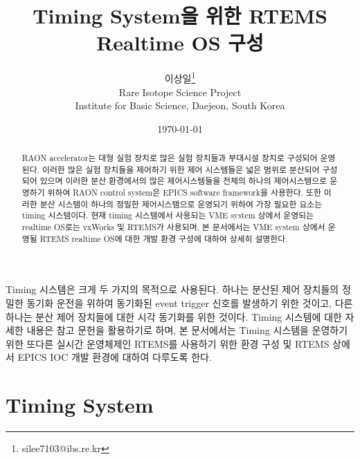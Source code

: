 \documentclass[11pt
  , a4paper
  , article
  , oneside
]{memoir}
\begin{document}
\newcommand{\technumber}{
  RAON Control-Document Series\\
  Revision : v1.0,   Release : 2014-12-24 fixed date}
\title{\textbf{Timing System을 위한 RTEMS Realtime OS 구성}}

\author{이상일\thanks{silee7103@ibs.re.kr} \\

  Rare Isotope Science Project\\
  Institute for Basic Science, Daejeon, South Korea
}
\date{\today}

\renewcommand{\maketitlehooka}{\begin{flushright}\textsf{\technumber}\end{flushright}}

\maketitle

\begin{abstract}
RAON accelerator는 대형 실험 장치로 많은 실험 장치들과 부대시설 장치로 구성되어 운영된다. 이러한 많은 실험 장치들을 제어하기 위한 제어 시스템들은 넓은 범위로 분산되어 구성되어 있으며 이러한 분산 환경에서의 많은 제어시스템들을 전체의 하나의 제어시스템으로 운영하기 위하여 RAON control system은 EPICS software framework을 사용한다. 또한 이러한 분산 시스템이 하나의 정밀한 제어시스템으로 운영되기 위하여 가장 필요한 요소는 timing 시스템이다. 현재 timing 시스템에서 사용되는 VME system 상에서 운영되는 realtime OS로는 vxWorks 및 RTEMS가 사용되며, 본 문서에서는 VME system 상에서 운영될 RTEMS realtime OS에 대한 개발 환경 구성에 대하여 상세히 설명한다. 
\end{abstract}

Timing 시스템은 크게 두 가지의 목적으로 사용된다. 하나는 분산된 제어 장치들의 정밀한 동기화 운전을 위하여 동기화된 event trigger 신호를 발생하기 위한 것이고, 다른 하나는 분산 제어 장치들에 대한 시각 동기화를 위한 것이다. Timing 시스템에 대한 자세한 내용은 참고 문헌을 활용하기로 하며, 본 문서에서는 Timing 시스템을 운영하기 위한 또다른 실시간 운영체제인 RTEMS를 사용하기 위한 환경 구성 및 RTEMS 상에서 EPICS IOC 개발 환경에 대하여 다루도록 한다.

\hfil\break

\chapter{Timing System}
\end{document}
